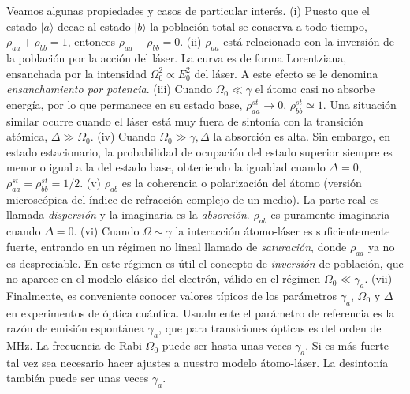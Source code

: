 \documentclass[12pt]{report}
\providecommand{\ket}[1]{\lvert #1 \rangle}
\begin{document}
Veamos algunas propiedades y casos de particular inter\'es. 
\newline (i) Puesto que el estado $\ket{a}$ decae al estado $\ket{b}$ la 
poblaci\'on total se conserva a todo tiempo, $\rho_{aa} +\rho_{bb} = 1$, 
entonces $\dot{\rho}_{aa} +\dot{\rho}_{bb} = 0$. 
\newline (ii) $\rho_{aa}$ est\'a relacionado con la inversi\'on de la poblaci\'on 
por la acci\'on del l\'aser. La curva es de forma Lorentziana, ensanchada por 
la intensidad $\Omega_0^2 \propto E_0^2$ del l\'aser. A este efecto se le 
denomina \textit{ensanchamiento por potencia}. 
\newline (iii) Cuando $\Omega_0 \ll \gamma$ el \'atomo casi no absorbe 
energ\'ia, por lo que permanece en su estado base, $\rho_{aa}^{st} \to 0$, 
$\rho_{bb}^{st} \simeq 1$. Una situaci\'on similar ocurre cuando el l\'aser 
est\'a muy fuera de sinton\'ia con la transici\'on at\'omica, 
$\Delta \gg \Omega_0$. 
\newline (iv) Cuando $\Omega_0 \gg \gamma, \Delta$ la absorci\'on es alta. 
Sin embargo, en estado estacionario, la probabilidad de ocupaci\'on del 
estado superior siempre es menor o igual a la del estado base, obteniendo 
la igualdad cuando $\Delta =0$, $\rho_{aa}^{st} = \rho_{bb}^{st} = 1/2$. 
\newline (v) $\rho_{ab}$ es la coherencia  o polarizaci\'on del \'atomo (versi\'on microsc\'opica del \'indice de refracci\'on complejo de un medio). La parte real 
es llamada \textit{dispersi\'on} y la imaginaria es la \textit{absorci\'on}. 
$\rho_{ab}$ es puramente imaginaria cuando $\Delta =0$. 
\newline (vi) Cuando $\Omega \sim \gamma$ la interacci\'on \'atomo-l\'aser 
es suficientemente fuerte, entrando en un r\'egimen no lineal llamado de \textit{saturaci\'on}, donde $\rho_{aa}$ ya no es despreciable. En este 
r\'egimen es \'util el concepto de \textit{inversi\'on} de poblaci\'on, que no 
aparece en el modelo cl\'asico del electr\'on, v\'alido en el r\'egimen 
$\Omega_0 \ll \gamma_a$.  \newline (vii) Finalmente, es conveniente conocer 
valores t\'ipicos de los par\'ametros $\gamma_a$, $\Omega_0$ y $\Delta$ en experimentos de \'optica cu\'antica. Usualmente el par\'ametro de referencia 
es la raz\'on de emisi\'on espont\'anea $\gamma_a$, que para transiciones 
\'opticas es del orden de MHz. La frecuencia de Rabi $\Omega_0$ puede 
ser hasta unas veces $\gamma_a$. Si es m\'as fuerte tal vez sea necesario 
hacer ajustes a nuestro modelo \'atomo-l\'aser. La desinton\'ia tambi\'en 
puede ser unas veces $\gamma_a$.  
\end{document}
